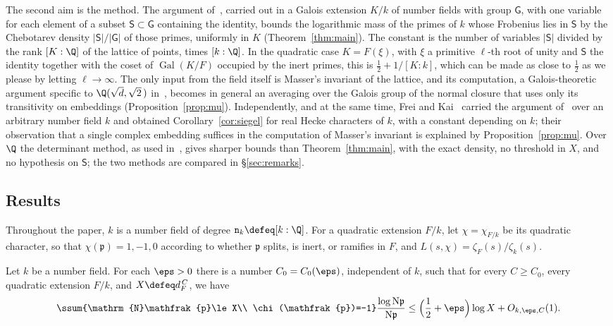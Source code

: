 \documentclass[11pt, reqno, twoside, letterpaper]{amsart}
\DeclareMathOperator{\Gal}{Gal}
\newcommand{\Nm}{\mathrm{N}}
\newcommand{\fp}{\mathfrak{p}}
\newcommand{\dk}{{\mathtt{n}_k}}
\newcommand{\auxp}{\ell}
\newcommand{\rou}{\xi}
\newcommand{\expC}{C}
\newcommand{\XX}{X}
\newcommand{\galKk}{\mathsf{G}}
\newcommand{\Kf}{K}
\newcommand{\Sset}{\mathsf{S}}
\begin{document}
The second aim is the method. The argument of~\cite{Ke}, carried
out in a Galois extension $\Kf/k$ of number fields with group
$\galKk$, with one variable for each element of a subset
$\Sset\subset\galKk$ containing the identity, bounds the logarithmic
mass of the primes of $k$ whose Frobenius lies in $\Sset$ by the
Chebotarev density $|\Sset|/|\galKk|$ of those primes, uniformly in
$\Kf$ (Theorem~\ref{thm:main}). The constant is the number of
variables $|\Sset|$ divided by the rank $[\Kf:\Q]$ of the lattice of
points, times $[k:\Q]$. In the quadratic case $\Kf=F(\rou)$, with
$\rou$ a primitive $\auxp$-th root of unity and $\Sset$ the identity
together with the coset of $\Gal(\Kf/F)$ occupied by the inert
primes, this is $\tfrac12+1/[\Kf:k]$, which can be made as close to
$\tfrac12$ as we please by letting $\auxp\to\infty$. The only input
from the field itself is Masser's invariant of the lattice, and its
computation, a Galois-theoretic argument specific to
$\Q(\sqrt d,\sqrt 2\,)$ in~\cite{Ke}, becomes in general an averaging
over the Galois group of the normal closure that uses only its
transitivity on embeddings (Proposition~\ref{prop:mu}).
Independently, and at the same time, Frei and Kai~\cite{FK} carried
the argument of~\cite{Ke} over an arbitrary number field $k$ and
obtained Corollary~\ref{cor:siegel} for real Hecke characters of
$k$, with a constant depending on $k$; their observation that a
single complex embedding suffices in the computation of Masser's
invariant is explained by Proposition~\ref{prop:mu}.
Over $\Q$ the determinant method, as used in~\cite{Ko}, gives sharper
bounds than Theorem~\ref{thm:main}, with the exact density, no
threshold in $\XX$, and no hypothesis on $\Sset$; the two methods are
compared in \S\ref{sec:remarks}.

\subsection{Results}

Throughout the paper, $k$ is a number field of degree
$\dk\defeq[k:\Q]$.
For a quadratic extension $F/k$, let $\chi=\chi_{F/k}$ be its
quadratic character, so that $\chi(\fp)=1,-1,0$ according to whether
$\fp$ splits, is inert, or ramifies in $F$, and
$L(s,\chi)=\zeta_F(s)/\zeta_k(s)$.

\begin{theorem}\label{thm:quadratic}
Let $k$ be a number field. For each $\eps>0$ there is a number
$\expC_0=\expC_0(\eps)$, independent of $k$, such that for every
$\expC\ge\expC_0$, every quadratic extension $F/k$, and
$\XX\defeq d_F^{\,\expC}$, we have
\[
\ssum{\Nm\fp\le \XX\\ \chi(\fp)=-1}\frac{\log\Nm\fp}{\Nm\fp}
\le\Big(\frac12+\eps\Big)\log \XX+O_{k,\eps,\expC}(1).
\]
\end{theorem}
\end{document}

